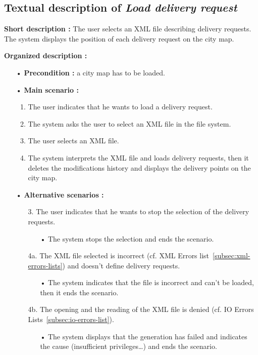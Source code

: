 \documentclass[paper=a4, fontsize=11pt]{report}
\numberwithin{equation}{section}		%
\numberwithin{figure}{section}		%
\numberwithin{table}{section}		%
\renewcommand{\it}[1]{\textit{#1}}
\begin{document}
\subsection{Textual description of \it{Load delivery request}}
\label{subsec:textual-description-of-load-delivery-request}

\textbf{Short description :} The user selects an XML file describing delivery requests. The system displays the position of each delivery request on the city map.

\textbf{Organized description :}

\begin{itemize}
  \item[•] \textbf{Precondition :} a city map has to be loaded.
  \item[•] \textbf{Main scenario :}
  \begin{enumerate}
    \item The user indicates that he wants to load a delivery request.
    \item The system asks the user to select an XML file in the file system.
    \item The user selects an XML file.
    \item The system interprets the XML file and loads delivery requests, then it deletes the modifications history and displays the delivery points on the city map.
  \end{enumerate}
  \item[•] \textbf{Alternative scenarios :}
  \begin{itemize}
    \item[3.] The user indicates that he wants to stop the selection of the delivery requests.
    \begin{itemize}
      \item[•] The system stops the selection and ends the scenario.
    \end{itemize}
    \item[4a.] The XML file selected is incorrect (cf. XML Errors list~\ref{subsec:xml-errors-lists}) and doesn’t define delivery requests.
    \begin{itemize}
      \item[•] The system indicates that the file is incorrect and can’t be loaded, then it ends the scenario.
    \end{itemize}
    \item[4b.] The opening and the reading of the XML file is denied (cf. IO Errors Lists~\ref{subsec:io-errors-list}).
    \begin{itemize}
      \item[•] The system displays that the generation has failed and indicates the cause (insufficient privileges…) and ends the scenario.
    \end{itemize}
  \end{itemize}
\end{itemize}
\end{document}
